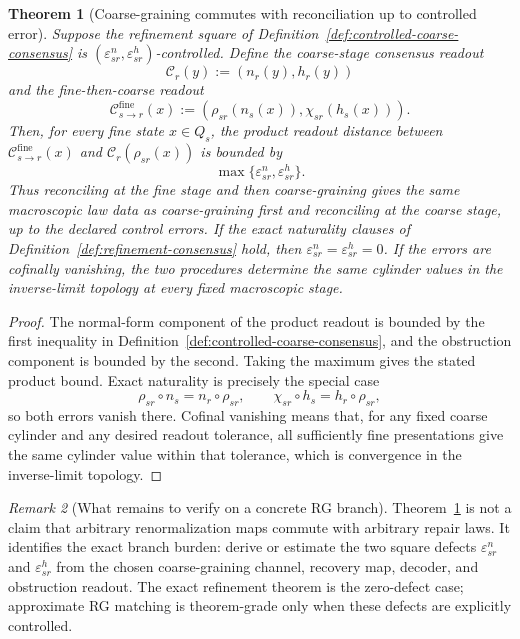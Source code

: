 \documentclass[11pt]{article}
\newtheorem{theorem}{Theorem}[section]
\theoremstyle{remark}
\newtheorem{remark}[theorem]{Remark}
\theoremstyle{plain}
\begin{document}
\begin{theorem}[Coarse-graining commutes with reconciliation up to controlled error]\label{thm:coarse-grain-consensus}
Suppose the refinement square of Definition~\ref{def:controlled-coarse-consensus} is
\((\varepsilon^n_{sr},\varepsilon^h_{sr})\)-controlled. Define the coarse-stage consensus readout
\[
\mathcal C_r(y):=(n_r(y),h_r(y))
\]
and the fine-then-coarse readout
\[
\mathcal C_{s\to r}^{\mathrm{fine}}(x):=(\rho_{sr}(n_s(x)),\chi_{sr}(h_s(x))).
\]
Then, for every fine state \(x\in Q_s\), the product readout distance between
\(\mathcal C_{s\to r}^{\mathrm{fine}}(x)\) and \(\mathcal C_r(\rho_{sr}(x))\) is bounded by
\[
\max\{\varepsilon^n_{sr},\varepsilon^h_{sr}\}.
\]
Thus reconciling at the fine stage and then coarse-graining gives the same macroscopic law data
as coarse-graining first and reconciling at the coarse stage, up to the declared control errors.
If the exact naturality clauses of Definition~\ref{def:refinement-consensus} hold, then
\(\varepsilon^n_{sr}=\varepsilon^h_{sr}=0\). If the errors are cofinally vanishing, the two
procedures determine the same cylinder values in the inverse-limit topology at every fixed
macroscopic stage.
\end{theorem}

\begin{proof}
The normal-form component of the product readout is bounded by the first inequality in
Definition~\ref{def:controlled-coarse-consensus}, and the obstruction component is bounded by the
second. Taking the maximum gives the stated product bound. Exact naturality is precisely the
special case
\[
\rho_{sr}\circ n_s=n_r\circ\rho_{sr},
\qquad
\chi_{sr}\circ h_s=h_r\circ\rho_{sr},
\]
so both errors vanish there. Cofinal vanishing means that, for any fixed coarse cylinder and any
desired readout tolerance, all sufficiently fine presentations give the same cylinder value
within that tolerance, which is convergence in the inverse-limit topology.
\end{proof}

\begin{remark}[What remains to verify on a concrete RG branch]\label{rem:coarse-grain-scope}
Theorem~\ref{thm:coarse-grain-consensus} is not a claim that arbitrary renormalization maps
commute with arbitrary repair laws. It identifies the exact branch burden: derive or estimate the
two square defects \(\varepsilon^n_{sr}\) and \(\varepsilon^h_{sr}\) from the chosen
coarse-graining channel, recovery map, decoder, and obstruction readout. The exact refinement
theorem is the zero-defect case; approximate RG matching is theorem-grade only when these defects
are explicitly controlled.
\end{remark}
\end{document}
